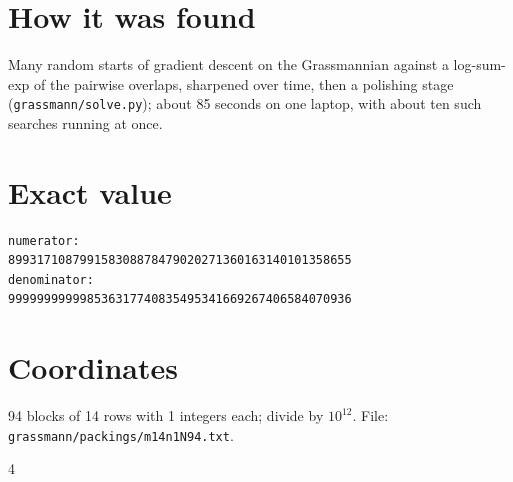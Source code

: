 \documentclass[11pt,a4paper]{article}
\begin{document}
\section{How it was found}
Many random starts of gradient descent on the Grassmannian against a log-sum-exp of the pairwise overlaps, sharpened over time, then a polishing stage (\texttt{grassmann/solve.py}); about 85 seconds on one laptop, with about ten such searches running at once.


\appendix
\section{Exact value}
{\small
\begin{verbatim}
numerator:
899317108799158308878479020271360163140101358655
denominator:
999999999998536317740835495341669267406584070936
\end{verbatim}}

\section{Coordinates}
94 blocks of 14 rows with 1 integers each; divide by $10^{12}$. File: \texttt{grassmann/packings/m14n1N94.txt}.
{\tiny
\begin{multicols}{4}
\end{multicols}}
\end{document}
